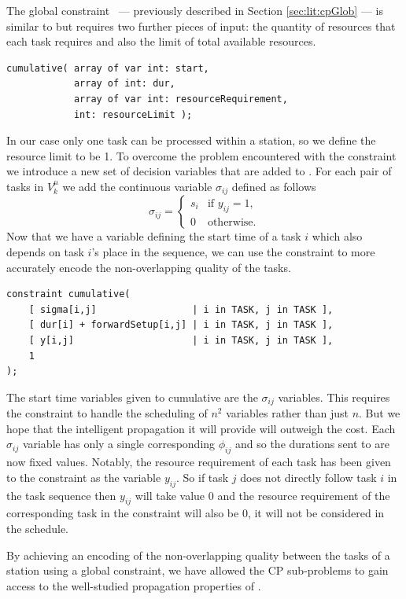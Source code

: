 The global constraint \cumu ~--- previously described
in Section \ref{sec:lit:cpGlob} ---
is similar to \disj but requires two further
pieces of input: the quantity of resources that each task
requires and also the limit of total available resources.
\begin{lstlisting}[language=minizinc]
cumulative( array of var int: start, 
            array of int: dur, 
            array of var int: resourceRequirement, 
            int: resourceLimit );
\end{lstlisting}%
In our case only one task can be processed within
a station, so we define the resource limit to be 1.
To overcome the problem encountered with the \disj constraint
we introduce a new set of decision variables that are added to
\spcp{}. For each pair of tasks in $V_k^\mu$ we add the continuous variable $\sigma_{ij}$ defined as follows
\[
	\sigma_{ij} =\displaystyle
	\begin{cases}
	s_i &\text{if } y_{ij}=1,\\
	0 &\text{otherwise}.
	\end{cases}
\]
Now that we have a variable defining the start time
of a task $i$ which also depends on task $i$'s place
in the sequence, we can use the \cumu constraint to more accurately
encode the non-overlapping quality of the tasks.
\begin{lstlisting}[language=minizinc]
constraint cumulative(
    [ sigma[i,j]                 | i in TASK, j in TASK ],
    [ dur[i] + forwardSetup[i,j] | i in TASK, j in TASK ],
    [ y[i,j]                     | i in TASK, j in TASK ],
    1
);
\end{lstlisting}%
The start time variables given to cumulative
are the $\sigma_{ij}$ variables.
This requires the \cumu constraint to handle the scheduling of
$n^2$ variables rather than just $n$.
But we hope that
the intelligent propagation it will provide
will outweigh the cost.
Each $\sigma_{ij}$ variable has only a single
corresponding $\phi_{ij}$ and so the durations
sent to \cumu are now fixed values.
Notably, the resource requirement of each task has been
given to the constraint as the variable $y_{ij}$.
So if task $j$ does not directly follow task $i$ in the
task sequence then $y_{ij}$ will take value 0 and the
resource requirement of the corresponding
task in the \cumu constraint will also be 0, \ie
it will not be considered in the schedule.

By achieving an encoding of the non-overlapping quality
between the tasks of a station using a global constraint,
we have allowed the CP sub-problems to gain access
to the well-studied propagation properties of \cumu.

